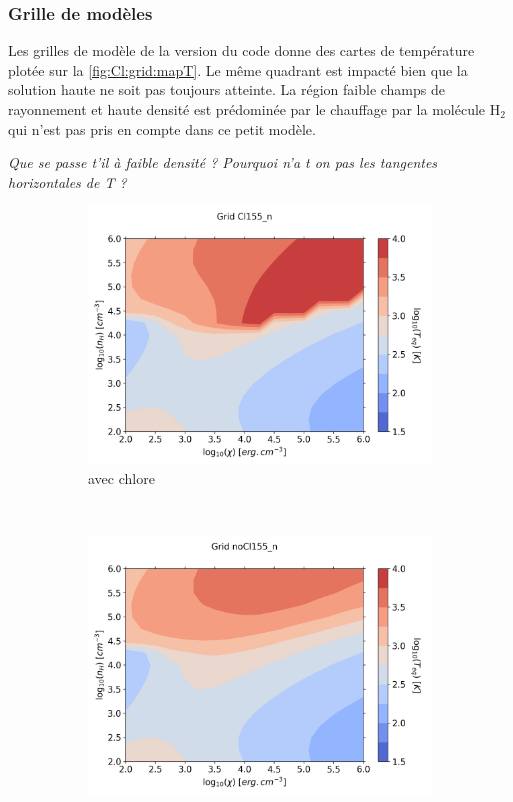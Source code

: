 \subsubsection{Grille de modèles}

Les grilles de modèle de la version du code \uncinq donne des cartes de température plotée sur la \autoref{fig:Cl:grid:mapT}. Le même quadrant est impacté bien que la solution haute ne soit pas toujours atteinte. La région faible champs de rayonnement et haute densité est prédominée par le chauffage par la molécule $\mathrm{H}_2$ qui n'est pas pris en compte dans ce petit modèle.  

\textit{Que se passe t'il à faible densité ? Pourquoi n'a t on pas les tangentes horizontales de T ?}

\begin{figure}[!htbp]
    \centering
    \begin{subfigure}[t]{0.45\textwidth} %
        \centering \includegraphics[trim = {0 0 0 1.5cm},clip,width=1\textwidth]{figure/Cl/grid/mapTCl.png}
        \caption{avec chlore}
    \end{subfigure}
    ~ 
    \begin{subfigure}[t]{0.45\textwidth}
        \centering \includegraphics[trim = {0 0 0 1.5cm},clip,width=1\textwidth]{figure/Cl/grid/mapT.png}

\end{subfigure}
\end{figure}
